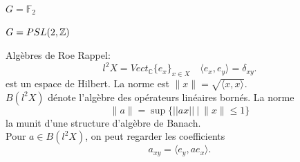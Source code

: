 
\begin{frame}{$G=\mathbb F_2$}
\begin{center}
\end{center}
\end{frame}

\begin{frame}{$G=PSL(2,\mathbb Z)$}
\begin{center}
\end{center}\end{frame}

\begin{frame}{Alg\`ebres de Roe}
Rappel: 
\[l^2X = Vect_{\mathbb C} \{e_x\}_{x\in X} \quad \langle e_x, e_y\rangle =\delta_{xy}. \]
est un espace de Hilbert. La norme est $\|x\| =\sqrt{\langle x, x\rangle}$.\\
\vfill
$B(l^2X)$ d\'enote l'alg\`ebre des op\'erateurs lin\'eaires born\'es. La norme
\[\|a\| = \sup \{ ||ax|| \ | \ \|x\| \leq 1 \} \] 
la munit d'une structure d'alg\`ebre de Banach.\\
\vfill
Pour $a\in B(l^2 X)$, on peut regarder les coefficients \[a_{xy} = \langle e_y, ae_x \rangle.\]
\end{frame}

